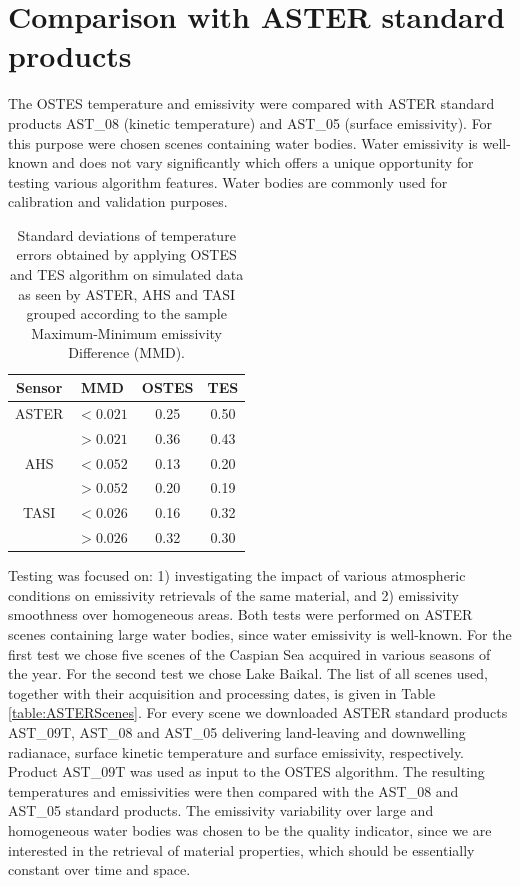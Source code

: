 \section{Comparison with ASTER standard products}

The OSTES temperature and emissivity were compared with ASTER standard products AST\_08 (kinetic temperature) and AST\_05 (surface emissivity). For this purpose were chosen scenes containing water bodies. Water emissivity is well-known and does not vary significantly which offers a unique opportunity for testing various algorithm features. Water bodies are commonly used for calibration \cite{TP05-2,T05} and validation \cite{TP05, TP01} purposes.

\begin{table}[!t]
\vspace{0.5em}
\footnotesize
\centering
\begin{tabular}{cccc}
\toprule
Sensor & MMD & OSTES & TES \\ \hline
ASTER 	& $< 0.021$ & 0.25 & 0.50 \\
 		& $> 0.021$ & 0.36 & 0.43 \\ \hline
AHS 		& $< 0.052$ & 0.13 & 0.20 \\
 		& $> 0.052$ & 0.20 & 0.19 \\ \hline
TASI 	& $< 0.026$ & 0.16 & 0.32 \\
 		& $> 0.026$ & 0.32 & 0.30 \\
\bottomrule
\end{tabular}
\vspace{1.5 em}
\caption{Standard deviations of temperature errors obtained by applying OSTES and TES algorithm on simulated data as seen by ASTER, AHS and TASI grouped according to the sample Maximum-Minimum emissivity Difference (MMD). }
\label{table:StandardDeviations}
\normalsize
\end{table}

Testing was focused on: 1) investigating the impact of  various atmospheric conditions on emissivity retrievals of the same material, and 2) emissivity smoothness over homogeneous areas. Both tests were performed on ASTER scenes containing large water bodies, since water emissivity is well-known. For the first test we chose five scenes of the Caspian Sea acquired in various seasons of the year. For the second test we chose Lake Baikal. The list of all scenes used, together with their acquisition and processing dates, is given in Table \ref{table:ASTERScenes}. For every scene we downloaded ASTER standard products AST\_09T, AST\_08 and AST\_05 delivering land-leaving and downwelling radianace, surface kinetic temperature and surface emissivity, respectively. Product AST\_09T was used as input to the OSTES algorithm. The resulting temperatures and emissivities were then compared with the AST\_08 and AST\_05 standard products. The emissivity variability over large and homogeneous water bodies was chosen to be the quality indicator, since we are interested in the retrieval of material properties, which should be essentially constant over time and space.


